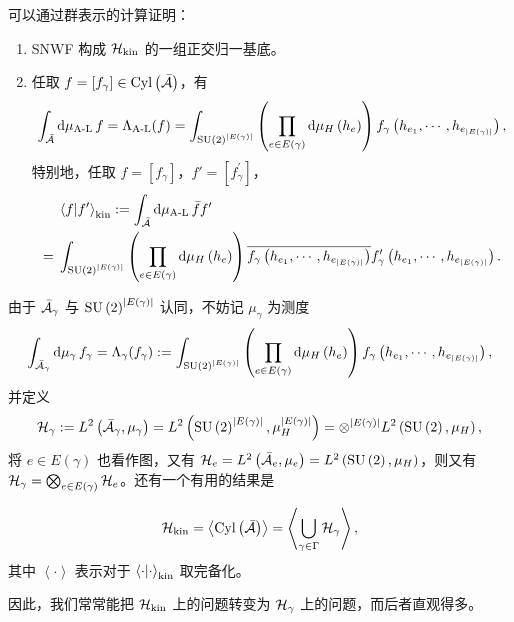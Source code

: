
			可以通过群表示的计算证明：
			\begin{Property}
				\begin{enumerate}
					\item SNWF 构成 $\mathcal{H}_{\text{kin}}$ 的一组正交归一基底。
					\item 任取 $f=[f_\gamma] \in \mathrm{Cyl}\left(\bar{\mathcal{A}}\right)$，有
					\begin{equation}
						\int_{\bar{\mathcal{A}}} \dd{\mu_{\text{A-L}}} f = \Lambda_{\text{A-L}}(f) = \int_{\mathrm{SU}\left(2\right)^{\abs{E(\gamma)}}} \left( \prod_{e\in E(\gamma)} \dd{\mu_H}(h_e) \right) f_\gamma\left( h_{e_1}, \cdots, h_{e_{\abs{E(\gamma)}}} \right),
					\end{equation}
					特别地，任取 $f=[f_\gamma]$，$f'=[f^\prime_\gamma]$，
					\begin{equation}
						\begin{split}
							&\ip{f}{f'}_{\text{kin}} \definedby \int_{\bar{\configurationspace{A}}} \dd{\mu_{\text{A-L}}} \bar{f} f'\\
							={}& \int_{\SU{2}^{\card{E(\gamma)}}} \left( \prod_{e\in E(\gamma)} \dd{\mu_H}(h_e) \right) \overline{f_\gamma\left( h_{e_1}, \cdots, h_{e_{\card{E(\gamma)}}} \right)}f^\prime_\gamma\left(h_{e_1}, \cdots, h_{e_{\card{E(\gamma)}}}\right).
						\end{split}
					\end{equation}
				\end{enumerate}
			\end{Property}
			由于 $\bar{\mathcal{A}}_\gamma$ 与 $\mathrm{SU}\left(2\right)^{\abs{E(\gamma)}}$ 认同，不妨记 $\mu_\gamma$ 为测度
			\begin{equation}
				\int_{\bar{\mathcal{A}}_\gamma} \dd{\mu_\gamma} f_\gamma = \Lambda_\gamma(f_\gamma) := \int_{\mathrm{SU}\left(2\right)^{\abs{E(\gamma)}}} \left( \prod_{e\in E(\gamma)} \dd{\mu_H}(h_e) \right) f_\gamma\left(h_{e_1}, \cdots, h_{e_{\abs{E(\gamma)}}}\right),
			\end{equation}
			并定义
			\begin{equation}
				\mathcal{H}_\gamma := L^2\left(\bar{\mathcal{A}}_\gamma,\mu_\gamma\right) = L^2 \left(\mathrm{SU}\left(2\right)^{\abs{E(\gamma)}}, \mu_H^{\abs{E(\gamma)}} \right) = \otimes^{\abs{E(\gamma)}} L^2\left(\mathrm{SU}\left(2\right), \mu_H\right),
			\end{equation}
			将 $e\in E(\gamma)$ 也看作图，又有 $\mathcal{H}_e = L^2\left(\bar{\mathcal{A}}_e,\mu_e\right) = L^2\left(\mathrm{SU}\left(2\right), \mu_H\right)$，则又有 $\mathcal{H}_\gamma = \bigotimes_{e\in E(\gamma)} \mathcal{H}_e$。还有一个有用的结果是
			\begin{Property}
				\begin{equation}
					\mathcal{H}_{\text{kin}} = \left\langle \mathrm{Cyl}\left( \bar{\mathcal{A}} \right) \right\rangle = \left\langle \bigcup_{\gamma \in \Gamma} \mathcal{H}_\gamma \right\rangle,
				\end{equation}
				其中 $\left\langle \cdot \right\rangle$ 表示对于 $\ip{\cdot}_{\text{kin}}$ 取完备化。
			\end{Property}
			因此，我们常常能把 $\mathcal{H}_{\text{kin}}$ 上的问题转变为 $\mathcal{H}_\gamma$ 上的问题，而后者直观得多。

